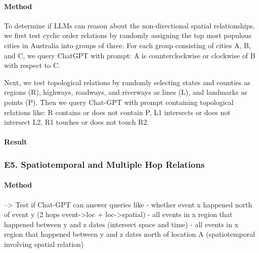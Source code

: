 \paragraph{Method}
To determine if LLMs can reason about the non-directional spatial relationships, we first test cyclic order relations by randomly assigning the top  most populous cities in Australia into  groups of three.
For each group consisting of cities A, B, and C, we query ChatGPT with prompt: A is counterclockwise or clockwise of B with respect to C.

Next, we test topological relations by randomly selecting states and counties as regions (R), highways, roadways, and riverways as lines (L), and landmarks as points (P).
Then we query Chat-GPT with prompt containing topological relations like: R contains or does not contain P, L1 intersects or does not intersect L2, R1 touches or does not touch R2. 


\paragraph{Result}


\subsubsection{E5. Spatiotemporal and Multiple Hop Relations}
\paragraph{Method}
--> Test if Chat-GPT can answer queries like
- whether event x happened north of event y (2 hops event->loc + loc->spatial)
- all events in x region that happened between y and z dates (intersect space and time)
- all events in x region that happened between y and z dates north of location A (spatiotemporal involving spatial relation) 

